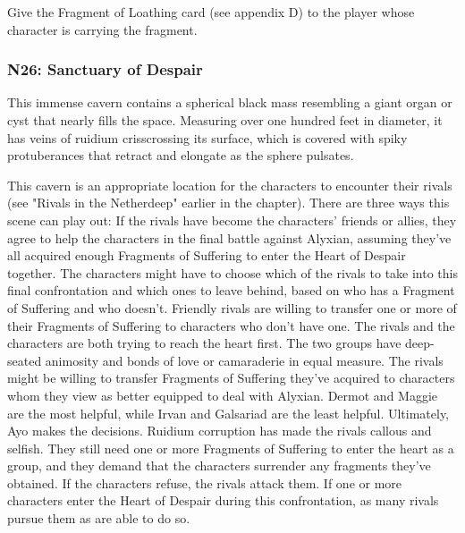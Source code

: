 \documentclass[10pt,a4,twoside,twocolumn,openany,nodeprecatedcode]{dndbook}
\begin{document}
Give the Fragment of Loathing card (see appendix D) to the player whose character is carrying the fragment.
\subsubsection{N26: Sanctuary of Despair}
\begin{DndReadAloud}{}
This immense cavern contains a spherical black mass resembling a giant organ or cyst that nearly fills the space. Measuring over one hundred feet in diameter, it has veins of ruidium crisscrossing its surface, which is covered with spiky protuberances that retract and elongate as the sphere pulsates.
\end{DndReadAloud}

This cavern is an appropriate location for the characters to encounter their rivals (see "Rivals in the Netherdeep" earlier in the chapter). There are three ways this scene can play out:
{{If the rivals have become the characters' friends or allies, they agree to help the characters in the final battle against Alyxian, assuming they've all acquired enough Fragments of Suffering to enter the Heart of Despair together. The characters might have to choose which of the rivals to take into this final confrontation and which ones to leave behind, based on who has a Fragment of Suffering and who doesn't. Friendly rivals are willing to transfer one or more of their Fragments of Suffering to characters who don't have one.}}
{{The rivals and the characters are both trying to reach the heart first. The two groups have deep-seated animosity and bonds of love or camaraderie in equal measure. The rivals might be willing to transfer Fragments of Suffering they've acquired to characters whom they view as better equipped to deal with Alyxian. Dermot and Maggie are the most helpful, while Irvan and Galsariad are the least helpful. Ultimately, Ayo makes the decisions.}}
{{Ruidium corruption has made the rivals callous and selfish. They still need one or more Fragments of Suffering to enter the heart as a group, and they demand that the characters surrender any fragments they've obtained. If the characters refuse, the rivals attack them. If one or more characters enter the Heart of Despair during this confrontation, as many rivals pursue them as are able to do so.}}
\end{document}
